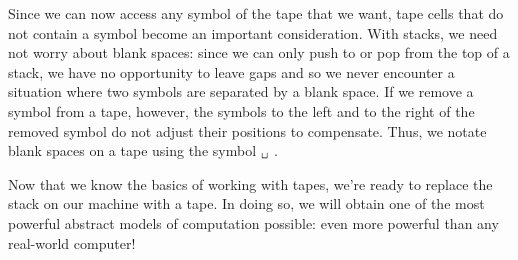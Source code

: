 Since we can now access any symbol of the tape that we want, tape cells that do not contain a symbol become an important consideration. With stacks, we need not worry about blank spaces: since we can only push to or pop from the top of a stack, we have no opportunity to leave gaps and so we never encounter a situation where two symbols are separated by a blank space. If we remove a symbol from a tape, however, the symbols to the left and to the right of the removed symbol do not adjust their positions to compensate. Thus, we notate blank spaces on a tape using the symbol $\blankspace$ .
\begin{center}
\end{center}

Now that we know the basics of working with tapes, we're ready to replace the stack on our machine with a tape. In doing so, we will obtain one of the most powerful abstract models of computation possible: even more powerful than any real-world computer!










